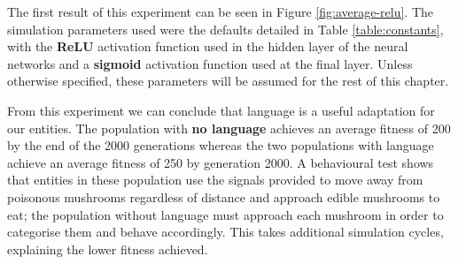 \documentclass[12pt,a4paper,twoside,openright]{report}
\begin{document}
The first result of this experiment can be seen in Figure \ref{fig:average-relu}. The simulation parameters used were the defaults detailed in Table \ref{table:constants}, with the {\bf ReLU} activation function used in the hidden layer of the neural networks and a {\bf sigmoid} activation function used at the final layer. Unless otherwise specified, these parameters will be assumed for the rest of this chapter.

From this experiment we can conclude that language is a useful adaptation for our entities. The population with {\bf no language} achieves an average fitness of 200 by the end of the 2000 generations whereas the two populations with language achieve an average fitness of 250 by generation 2000. A behavioural test shows that entities in these population use the signals provided to move away from poisonous mushrooms regardless of distance and approach edible mushrooms to eat; the population without language must approach each mushroom in order to categorise them and behave accordingly. This takes additional simulation cycles, explaining the lower fitness achieved.
\end{document}
